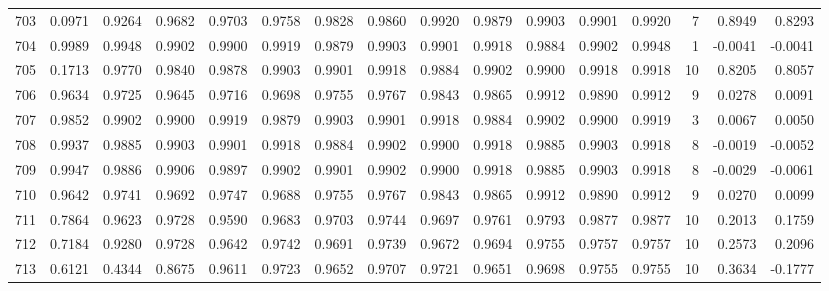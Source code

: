 \begin{tabular}{lrrrrrrrrrrrrrrr}
703 &      0.0971 &  0.9264 &  0.9682 &  0.9703 &  0.9758 &  0.9828 &  0.9860 &  0.9920 &  0.9879 &  0.9903 &   0.9901 &     0.9920 &      7 &                    0.8949 &                     0.8293 \\
704 &      0.9989 &  0.9948 &  0.9902 &  0.9900 &  0.9919 &  0.9879 &  0.9903 &  0.9901 &  0.9918 &  0.9884 &   0.9902 &     0.9948 &      1 &                   -0.0041 &                    -0.0041 \\
705 &      0.1713 &  0.9770 &  0.9840 &  0.9878 &  0.9903 &  0.9901 &  0.9918 &  0.9884 &  0.9902 &  0.9900 &   0.9918 &     0.9918 &     10 &                    0.8205 &                     0.8057 \\
706 &      0.9634 &  0.9725 &  0.9645 &  0.9716 &  0.9698 &  0.9755 &  0.9767 &  0.9843 &  0.9865 &  0.9912 &   0.9890 &     0.9912 &      9 &                    0.0278 &                     0.0091 \\
707 &      0.9852 &  0.9902 &  0.9900 &  0.9919 &  0.9879 &  0.9903 &  0.9901 &  0.9918 &  0.9884 &  0.9902 &   0.9900 &     0.9919 &      3 &                    0.0067 &                     0.0050 \\
708 &      0.9937 &  0.9885 &  0.9903 &  0.9901 &  0.9918 &  0.9884 &  0.9902 &  0.9900 &  0.9918 &  0.9885 &   0.9903 &     0.9918 &      8 &                   -0.0019 &                    -0.0052 \\
709 &      0.9947 &  0.9886 &  0.9906 &  0.9897 &  0.9902 &  0.9901 &  0.9902 &  0.9900 &  0.9918 &  0.9885 &   0.9903 &     0.9918 &      8 &                   -0.0029 &                    -0.0061 \\
710 &      0.9642 &  0.9741 &  0.9692 &  0.9747 &  0.9688 &  0.9755 &  0.9767 &  0.9843 &  0.9865 &  0.9912 &   0.9890 &     0.9912 &      9 &                    0.0270 &                     0.0099 \\
711 &      0.7864 &  0.9623 &  0.9728 &  0.9590 &  0.9683 &  0.9703 &  0.9744 &  0.9697 &  0.9761 &  0.9793 &   0.9877 &     0.9877 &     10 &                    0.2013 &                     0.1759 \\
712 &      0.7184 &  0.9280 &  0.9728 &  0.9642 &  0.9742 &  0.9691 &  0.9739 &  0.9672 &  0.9694 &  0.9755 &   0.9757 &     0.9757 &     10 &                    0.2573 &                     0.2096 \\
713 &      0.6121 &  0.4344 &  0.8675 &  0.9611 &  0.9723 &  0.9652 &  0.9707 &  0.9721 &  0.9651 &  0.9698 &   0.9755 &     0.9755 &     10 &                    0.3634 &                    -0.1777 \\

\end{tabular}
